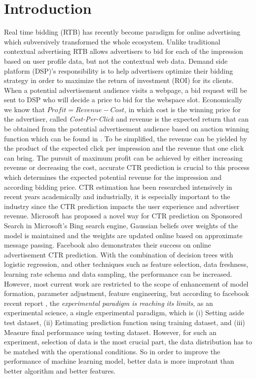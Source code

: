 \chapter{Introduction}
\label{chapterlabel1}

Real time bidding (RTB) has recently become paradigm for online advertising which subversively transformed the whole ecosystem. Unlike traditional contextual advertising
RTB allows advertisers to bid for each of the impression based on user profile data, but not the contextual web data. Demand side platform (DSP)'s responsibility is to help advertisers optimize their bidding strategy in order to maximize the return of investment (ROI) for its clients. When a potential advertisement audience visits a webpage, a bid request will be sent to DSP who will decide a price to bid for the webspace slot. Economically we know that \(Profit = Revenue - Cost\), in which cost is the winning price for the advertiser, called \textit{Cost-Per-Click} and revenue is the expected return that can be obtained from the potential advertisement audience based on auction winning function which can be found in \cite{zhang2014optimal}. To be simplified, the revenue can be yielded by the product of the expected click per impression and the revenue that one click can bring. The pursuit of maximum profit can be achieved by either increasing revenue or decreasing the cost, accurate CTR prediction is crucial to this process which determines the expected potential revenue for the impression and according bidding price. 
CTR estimation has been researched intensively in recent years academically and industrially, it is especially important to the industry since the CTR prediction impacts the user experience and advertiser revenue. Microsoft \cite{graepel2010web}has proposed a novel way for CTR prediction on Sponsored Search in Microsoft’s Bing search engine, Gaussian beliefs over weights of the model is maintained and the weights are updated online based on approximate message passing. Facebook \cite{he2014practical} also demonstrates their success on online advertisement CTR prediction. With the combination of decision trees with logistic regression, and other techniques such as feature selection, data freshness, learning rate schema and data sampling, the performance can be increased. However, most current work are restricted to the scope of enhancement of model formation, parameter adjustment, feature engineering, but according to facebook recent report \cite{facebook2015}, the \textit{experimental paradigm is reaching its limits}, as an experimental science, a single experimental paradigm, which is (i) Setting aside test dataset, (ii) Estimating prediction function using training dataset, and (iii) Measure final performance using testing dataset. However, for such an experiment, selection of data is the most crucial part, the data distribution has to be matched with the operational conditions. So in order to improve the performance of machine learning model, better data is more improtant than better algorithm and better features.

